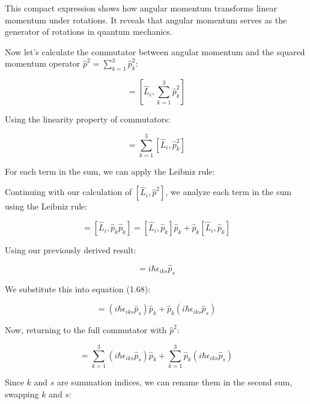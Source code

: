 \documentclass[10pt]{article}
\begin{document}
This compact expression shows how angular momentum transforms linear momentum under rotations. It reveals that angular momentum serves as the generator of rotations in quantum mechanics.

Now let's calculate the commutator between angular momentum and the squared momentum operator $\hat{p}^2 = \sum_{k=1}^3 \hat{p}_k^2$:

\begin{equation*}
[\hat{L}_i, \hat{p}^2] = \left[\hat{L}_i, \sum_{k=1}^3 \hat{p}_k^2\right] \tag{1.66}
\end{equation*}

Using the linearity property of commutators:

\begin{equation*}
[\hat{L}_i, \hat{p}^2] = \sum_{k=1}^3 [\hat{L}_i, \hat{p}_k^2] \tag{1.67}
\end{equation*}

For each term in the sum, we can apply the Leibniz rule:

Continuing with our calculation of $[\hat{L}_i, \hat{p}^2]$, we analyze each term in the sum using the Leibniz rule:

\begin{equation*}
[\hat{L}_i, \hat{p}_k^2] = [\hat{L}_i, \hat{p}_k\hat{p}_k] = [\hat{L}_i, \hat{p}_k]\hat{p}_k + \hat{p}_k[\hat{L}_i, \hat{p}_k] \tag{1.68}
\end{equation*}

Using our previously derived result:

\begin{equation*}
[\hat{L}_i, \hat{p}_k] = i\hbar\epsilon_{iks}\hat{p}_s \tag{1.69}
\end{equation*}

We substitute this into equation (1.68):

\begin{equation*}
[\hat{L}_i, \hat{p}_k^2] = (i\hbar\epsilon_{iks}\hat{p}_s)\hat{p}_k + \hat{p}_k(i\hbar\epsilon_{iks}\hat{p}_s) \tag{1.70}
\end{equation*}

Now, returning to the full commutator with $\hat{p}^2$:

\begin{equation*}
[\hat{L}_i, \hat{p}^2] = \sum_{k=1}^{3}(i\hbar\epsilon_{iks}\hat{p}_s)\hat{p}_k + \sum_{k=1}^{3}\hat{p}_k(i\hbar\epsilon_{iks}\hat{p}_s) \tag{1.71}
\end{equation*}

Since $k$ and $s$ are summation indices, we can rename them in the second sum, swapping $k$ and $s$:
\end{document}

